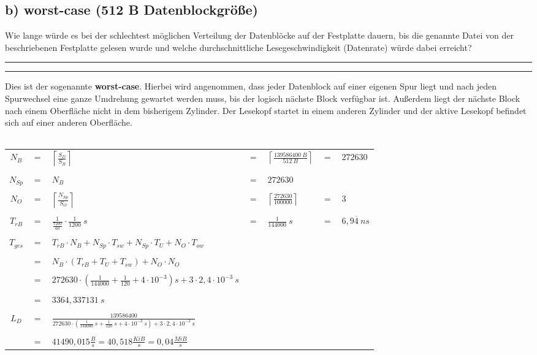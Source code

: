 \documentclass{ti2}
\makeatletter
\renewenvironment{quote}{%
	\vskip 10\p@
	\parindent\z@
	\tcolorbox[
	breakable, sharp corners,
	boxrule=\z@, boxsep=\z@,
	left=\z@, right=\z@,
	top=\z@, bottom=\z@,
	colback=sx-yellow
	]
	{\color{sx-orange}\d@ublerule}
	\vskip 5\p@
	\list{}{\rightmargin\leftmargin}%
	\item\relax
}{%
\endlist
{\color{sx-orange}\d@ublerule}
\endtcolorbox
\vskip 5\p@
}
\def\d@ublerule{\hrule\@width\hsize\kern 1.5\p@\hrule\@width\hsize}
\makeatother
\begin{document}
\subsection*{b) worst-case (512 B Datenblockgröße)}
\begin{quote}
Wie lange würde es bei der schlechtest möglichen Verteilung der Datenblöcke auf der Festplatte dauern, bis die genannte Datei von der beschriebenen Festplatte gelesen wurde und welche durchschnittliche Lesegeschwindigkeit (Datenrate) würde dabei erreicht?
\end{quote}
Dies ist der sogenannte \textbf{worst-case}. Hierbei wird angenommen, dass jeder Datenblock auf einer eigenen Spur liegt und nach jeden Spurwechsel eine ganze Umdrehung gewartet werden muss, bis der logisch nächste Block verfügbar ist. Außerdem liegt der nächste Block nach einem Oberfläche nicht in dem bisherigem Zylinder. Der Lesekopf startet in einem anderen Zylinder und der aktive Lesekopf befindet sich auf einer anderen Oberfläche.\\ \\
\begin{tabular}{cclclcl}
$N_B$ & $=$ & $\left\lceil\frac{S_D}{S_B}\right\rceil$ & $=$ & $\left\lceil\frac{139586400~B}{512~B}\right\rceil$ & $=$ & $272630$ \\ \\

$N_{Sp}$ & $=$ & $N_B$ & $=$ & $272630$ \\ \\

$N_O$ & $=$ & $\left\lceil\frac{N_{Sp}}{S_O}\right\rceil$ & $=$ & $\left\lceil\frac{272630}{100000}\right\rceil$ & $=$ & $3$ \\ \\

$T_{rB}$ & $=$ & $\frac{1}{\frac{7200}{60}}\cdot\frac{1}{1200}~s$ & $=$ & $\frac{1}{144000}~s$ & $=$ & $6,9\overline{4}~ns$ \\ \\
$T_{ges}$ & $=$ & $T_{rB} \cdot N_B + N_{Sp}\cdot T_{sw} + N_{Sp} \cdot T_U + N_O \cdot T_{ow}$\\ \\
& $=$ & $N_B\cdot\left(T_{rB} + T_U + T_{sw}\right) + N_O \cdot N_O$\\ \\
& $=$ & $272630\cdot\left(\frac{1}{144000} + \frac{1}{120} + 4 \cdot 10^{-3}\right)s + 3 \cdot 2,4\cdot10^{-3}~s$ \\ \\
& $=$ & $3364,337131~s$\\ \\

$L_D$ & $=$ & $\frac{139586400}{272630\cdot\left(\frac{1}{144000}~s + \frac{1}{120}~s + 4 \cdot 10^{-3}~s\right) + 3 \cdot 2,4\cdot10^{-3}~s}$ \\ \\
& $=$ & $41490,015\frac{B}{s}=40,518\frac{KiB}{s}=0,04\frac{MiB}{s}$
\end{tabular}
\newpage
\end{document}
